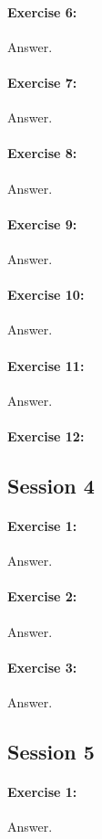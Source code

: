 \documentclass{article}
\begin{document}
\paragraph{Exercise 6:}
Answer.
\paragraph{Exercise 7:}
Answer.
\paragraph{Exercise 8:}
Answer.
\paragraph{Exercise 9:}
Answer.
\paragraph{Exercise 10:}
Answer.
\paragraph{Exercise 11:}
Answer.
\paragraph{Exercise 12:}
\newpage

\subsection*{Session 4}
\paragraph{Exercise 1:}
Answer.
\paragraph{Exercise 2:}
Answer.
\paragraph{Exercise 3:}
Answer.
\newpage

\subsection*{Session 5}
\paragraph{Exercise 1:}
Answer.
\end{document}
